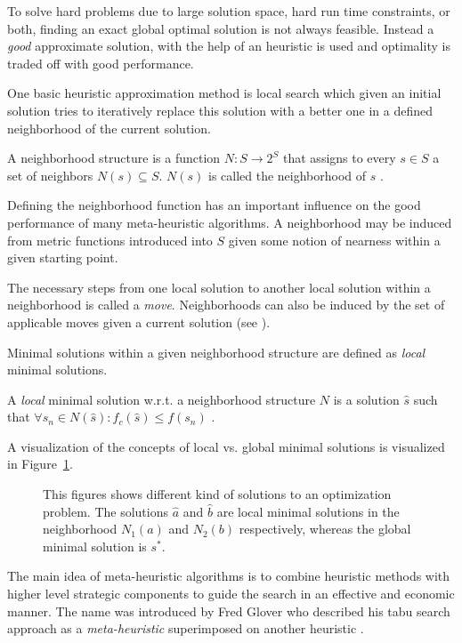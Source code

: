 To solve hard problems due to large solution space, hard run time constraints, or both, finding an exact global optimal solution is not always feasible. 
Instead a \emph{good} approximate solution, with the help of an heuristic is used and optimality is traded off with good performance.

One basic heuristic approximation method is local search which given an initial solution tries to iteratively replace this solution with a better one in a defined neighborhood of the current solution. 
\begin{definition}\label{def:neighborhood}
A neighborhood structure is a function $N:S\rightarrow 2^S$ that assigns to every $s \in S$ a set of neighbors $N(s) \subseteq S$. $N(s)$ is called the neighborhood of $s$ \cite{blum2003metaheuristics}.
\end{definition}
Defining the neighborhood function has an important influence on the good performance of many meta-heuristic algorithms. 
A neighborhood may be induced from metric functions introduced into $S$ given some notion of nearness within a given starting point. 

The necessary steps from one local solution to another local solution within a neighborhood is called a \emph{move}. Neighborhoods can also be induced by the set of applicable moves given a current solution (see \cite{gendreau2003tabusearch}).

Minimal solutions within a given neighborhood structure are defined as \emph{local} minimal solutions.
\begin{definition}
 A \emph{local} minimal solution w.r.t. a neighborhood structure $N$ is a solution $\hat{s}$  such that $\forall s_n \in N(\hat{s}):f_c(\hat{s})\leq f(s_n)$ \cite{blum2003metaheuristics}. 
\end{definition}
A visualization of the concepts of local vs. global minimal solutions is visualized in Figure~\ref{fig:fig_local_global}.
\begin{figure}[thpb]
   \footnotesize
   \centering
   \def\svgwidth{0.75\textwidth}
        
   \caption[]{This figures shows different kind of solutions to an optimization problem. The solutions $\hat{a}$ and $\hat{b}$ are local minimal solutions in the neighborhood $N_1(a)$ and $N_2(b)$ respectively, whereas the global minimal solution is $s^*$.}
   \label{fig:fig_local_global}
\end{figure}

The main idea of meta-heuristic algorithms is to combine heuristic methods with higher level strategic components to guide the search in an effective and economic manner. 
The name was introduced by Fred Glover who described his tabu search approach \grqq as a \emph{meta-heuristic} superimposed on another heuristic \grqq \cite{glover1988tabu}. 

